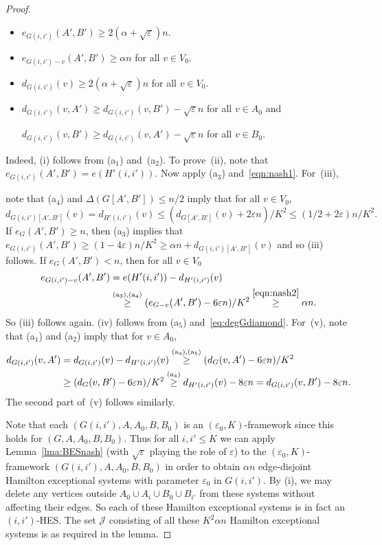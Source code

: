 \documentclass{memo-l}
\def\COMMENT#1{}
\def\eps{\varepsilon}
\def\epszero{\eps_0}
\numberwithin{section}{chapter}
\numberwithin{equation}{section}
\numberwithin{firstthm}{section}
\numberwithin{figure}{section}
\begin{document}
\begin{proof}
\begin{itemize}
\item[{\rm (ii)}] $e_{G(i,i')}(A',B')  \ge  2(\alpha + \sqrt{\eps} ) n $.
\item[{\rm (iii)}] $e_{G(i,i')- v }(A',B')  \ge  \alpha n $ for all $v \in V_0$.
\item[{\rm (iv)}] $d_{G(i,i')}(v )  \ge  2(\alpha + \sqrt{\eps}) n $ for all $v \in V_0$.
\item[{\rm (v)}] $d_{G(i,i')}(v,A' )  \ge  d_{G(i,i')}(v,B' ) - \sqrt{\eps} n$ for all $v \in A_0$ and%
   \COMMENT{We don't get $\eps$ here (but we could get $10\eps$ if we want).}
$d_{G(i,i')}(v,B' )  \ge  d_{G(i,i')}(v,A' ) - \sqrt{\eps} n$ for all $v \in B_0$.
\end{itemize}
Indeed, (i) follows from (a$_1$) and~(a$_2$).
To prove~(ii), note that $e_{G(i,i')}(A',B')=e(H'(i,i'))$.
Now apply (a$_3$) and~\eqref{eqn:nash1}.
For~(iii),%
	\COMMENT{Previsouly, we have `(iii) follows from~\eqref{eqn:nash2} and (a$_3$).', but I don't think that is not enough. This stuff is new.}
note that (a$_4$) and $\Delta(G[A',B']) \le n/2$ imply that for all $v \in V_0$, 
$$d_{G(i,i')[A',B']}(v) = d_{H'(i,i')} (v) \le (d_{G[A',B']}(v)+ 2 \eps n) /K^2 \le (1/2 +2\eps)n/K^2.$$ 
If $e_G(A',B') \ge n$, then (a$_3$) implies that $e_{G(i,i')}(A',B') \ge (1- 4 \eps) n/K^2 \ge \alpha n + d_{G(i,i')[A',B']}(v)$ and so (iii) follows.
If $e_G(A',B') < n$, then for all $v \in V_0$
\begin{align*}
e_{G(i,i')- v }(A',B') 
& = e ( H'(i,i') ) - d_{H'(i,i')}(v) \\ & \stackrel{({\rm a_3}),({\rm a_4})}{\ge} (  e_{G - v}(A',B')   - 6 \eps n  )/K^2 \stackrel{\eqref{eqn:nash2}}{\ge} \alpha n.
\end{align*}
So (iii) follows again.
(iv) follows from (a$_5$) and~\eqref{eq:degGdiamond}.
For~(v), note that (a$_1$) and (a$_2$) imply that 
for $v \in A_0$, 
\begin{align*}
d_{G(i,i')}(v,A' ) & =d_{G(i,i')}(v) -d_{H'(i,i')}(v) \stackrel{({\rm a_4}),({\rm a_5})}{\geq} ( d_{G}(v,A')  - 6\eps n)/K^2 \\
& \ge  (d_{G}(v,B')  - 6\eps n)/K^2 \stackrel{({\rm a_4})}{\geq} d_{H'(i,i')}(v)- 8\eps n= d_{G(i,i')}(v,B' )- 8\eps n.
\end{align*}
The second part of~(v) follows similarly.

Note that each $(G(i,i'),A,A_0,B,B_0)$ is an $(\epszero, K)$-framework since this holds for $(G,A,A_0,B,B_0)$.
Thus for all $i,i'\le K$ we can apply Lemma~\ref{lma:BESnash} (with $\sqrt{\eps}$ playing the role of $\eps$)
to the $(\epszero, K)$-framework $(G(i,i'),A,A_0,B,B_0)$
in order to obtain $\alpha n $ edge-disjoint Hamilton exceptional systems
with parameter $\eps_0$ in $G(i,i')$. 
By (i), we may delete any vertices outside $A_0 \cup A_i \cup B_0 \cup B_{i'}$ from these systems without affecting their edges.
So each of these Hamilton exceptional systems is in fact an $(i,i')$-HES.
The set $\mathcal{J}$ consisting of all these $K^2\alpha n$ Hamilton exceptional systems is as required in the lemma.
\end{proof}
\end{document}
